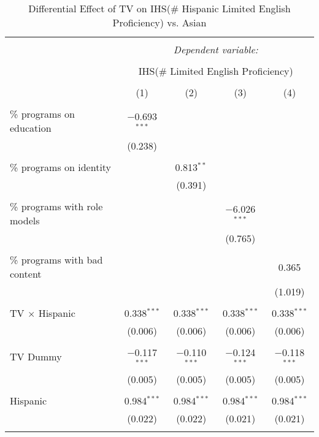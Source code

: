 
\begin{table}[!htbp] \centering 
  \caption{Differential Effect of TV on IHS(\# Hispanic Limited English Proficiency) vs. Asian} 
  \label{} 
\begin{tabular}{@{\extracolsep{-2pt}}lcccc} 
\\[-1.8ex]\hline 
\hline \\[-1.8ex] 
 & \multicolumn{4}{c}{\textit{Dependent variable:}} \\ 
\cline{2-5} 
\\[-1.8ex] & \multicolumn{4}{c}{IHS(\# Limited English Proficiency)} \\ 
\\[-1.8ex] & (1) & (2) & (3) & (4)\\ 
\hline \\[-1.8ex] 
 \% programs on education & $-$0.693$^{***}$ &  &  &  \\ 
  & (0.238) &  &  &  \\ 
  & & & & \\ 
 \% programs on identity &  & 0.813$^{**}$ &  &  \\ 
  &  & (0.391) &  &  \\ 
  & & & & \\ 
 \% programs with role models &  &  & $-$6.026$^{***}$ &  \\ 
  &  &  & (0.765) &  \\ 
  & & & & \\ 
 \% programs with bad content &  &  &  & 0.365 \\ 
  &  &  &  & (1.019) \\ 
  & & & & \\ 
 TV $\times$ Hispanic & 0.338$^{***}$ & 0.338$^{***}$ & 0.338$^{***}$ & 0.338$^{***}$ \\ 
  & (0.006) & (0.006) & (0.006) & (0.006) \\ 
  & & & & \\ 
 TV Dummy & $-$0.117$^{***}$ & $-$0.110$^{***}$ & $-$0.124$^{***}$ & $-$0.118$^{***}$ \\ 
  & (0.005) & (0.005) & (0.005) & (0.005) \\ 
  & & & & \\ 
 Hispanic & 0.984$^{***}$ & 0.984$^{***}$ & 0.984$^{***}$ & 0.984$^{***}$ \\ 
  & (0.022) & (0.022) & (0.021) & (0.021) \\ 
  & & & & \\ 

\end{tabular}
\end{table}

